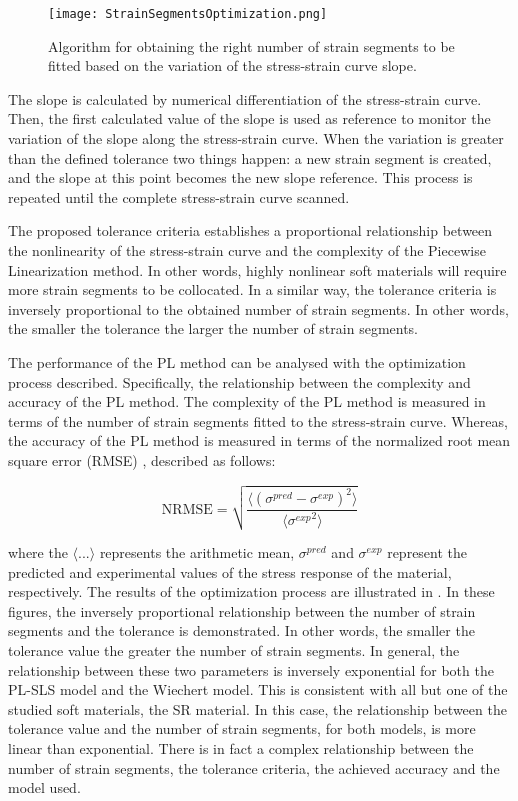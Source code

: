 \begin{figure}[H]
	\centering
	\texttt{[image: StrainSegmentsOptimization.png]}
	\caption{ Algorithm for obtaining the right number of strain segments to be fitted based on the variation of the stress-strain curve slope.}
	\label{fig:FCsegments}
\end{figure}

The slope is calculated by numerical differentiation of the stress-strain curve. Then, the first calculated value of the slope is used as reference to monitor the variation of the slope along the stress-strain curve. When the variation is greater than the defined tolerance two things happen: a new strain segment is created, and the slope at this point becomes the new slope reference. This process is repeated until the complete stress-strain curve scanned.

The proposed tolerance criteria establishes a proportional relationship between the nonlinearity of the stress-strain curve and the complexity of the Piecewise Linearization method. In other words, highly nonlinear soft materials will require more strain segments to be collocated. In a similar way, the tolerance criteria is inversely proportional to the obtained number of strain segments. In other words, the smaller the tolerance the larger the number of strain segments.

The performance of the PL method can be analysed with the optimization process described. Specifically, the relationship between the complexity and accuracy of the PL method. The complexity of the PL method is measured in terms of the number of strain segments fitted to the stress-strain curve. Whereas, the accuracy of the PL method is measured in terms of the normalized root mean square error (RMSE) \cite{bergstrom2015mechanics}, described as follows:

\begin{equation}
    \mathrm{NRMSE} = \sqrt{  \frac{\langle (\sigma^{pred} - \sigma^{exp})^2 \rangle}{\langle {\sigma^{exp}}^2 \rangle} }
\label{eq2}
\end{equation}

\noindent where the  $\langle ... \rangle$ represents the arithmetic mean, $\sigma^{pred}$ and $\sigma^{exp}$ represent the predicted and experimental values of the stress response of the material, respectively. The results of the optimization process are illustrated in . In these figures, the inversely proportional relationship between the number of strain segments and the tolerance is demonstrated. In other words, the smaller the tolerance value the greater the number of strain segments. In general, the relationship between these two parameters is inversely exponential for both the PL-SLS model and the Wiechert model. This is consistent with all but one of the studied soft materials, the SR material. In this case, the relationship between the tolerance value and the number of strain segments, for both models, is more linear than exponential. There is in fact a complex relationship between the number of strain segments, the tolerance criteria, the achieved accuracy and the model used.

